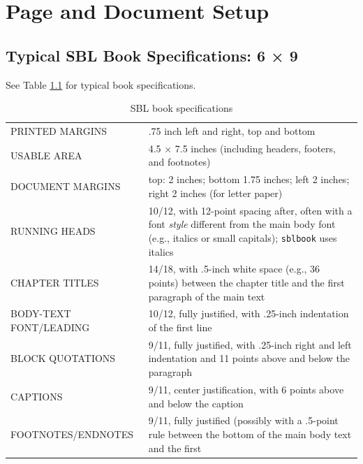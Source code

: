 \documentclass[sblidx={ancient sources, modern authors, subject}]{sblbook}
\begin{document}

\mainmatter

\chapter{Page and Document Setup}

\section{Typical SBL Book Specifications: 6 × 9}

See Table \ref{bookspecs} for typical book specifications.

\begin{table}
  \centering
  \caption{SBL book specifications}
  \label{bookspecs}
  \begin{tabular}{@{}lp{5.7cm}@{}}
    \MakeUppercase{Printed margins} & .75 inch left and right, top and
    bottom\index{margins} \\
    \MakeUppercase{Usable area} & 4.5 × 7.5 inches (including
    headers\index{headers}, footers\index{footers}, and
    footnotes\index{footnotes}) \\
    \MakeUppercase{Document margins} & top: 2 inches; bottom 1.75 inches; left
    2 inches; right 2 inches (for letter paper) \\
    \MakeUppercase{Running heads} & 10/12, with 12-point spacing after, often
    with a font \emph{style} different from the main body font (e.g., italics
    or small capitals); \texttt{sblbook} uses italics\index{running heads} \\
    \MakeUppercase{Chapter titles} & 14/18, with .5-inch white space (e.g., 36
    points) between the chapter\index{chapters} title and the first paragraph
    of the main text \\
    \MakeUppercase{Body-text font/leading} & 10/12, fully
    justified\index{justification}, with .25-inch indentation of the first
    line\index{font!size} \\
    \MakeUppercase{Block quotations} & 9/11, fully justified, with .25-inch
    right and left indentation and 11 points above and below the
    paragraph\index{quotations!block} \\
    \MakeUppercase{Captions} & 9/11, center justification, with 6 points above
    and below the caption\index{captions} \\
    \MakeUppercase{Footnotes/endnotes} & 9/11, fully justified (possibly with
    a .5-point rule between the bottom of the main body text and the first

\end{tabular}
\end{table}
\end{document}

